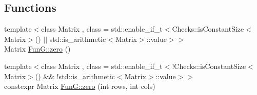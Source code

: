 \subsection*{Functions}
\begin{DoxyCompactItemize}
\item 
{\footnotesize template$<$class Matrix , class  = std\+::enable\+\_\+if\+\_\+t$<$\+Checks\+::is\+Constant\+Size$<$\+Matrix$>$() $\vert$$\vert$ std\+::is\+\_\+arithmetic$<$\+Matrix$>$\+::value$>$$>$ }\\Matrix \hyperlink{namespaceFunG_a649b4470d6def401959bfea3a368c48c}{Fun\+G\+::zero} ()
\item 
{\footnotesize template$<$class Matrix , class  = std\+::enable\+\_\+if\+\_\+t$<$!\+Checks\+::is\+Constant\+Size$<$\+Matrix$>$() \&\& !std\+::is\+\_\+arithmetic$<$\+Matrix$>$\+::value$>$$>$ }\\constexpr Matrix \hyperlink{namespaceFunG_ae633433339ba30207aa526e54e3924b4}{Fun\+G\+::zero} (int rows, int cols)
\end{DoxyCompactItemize}
